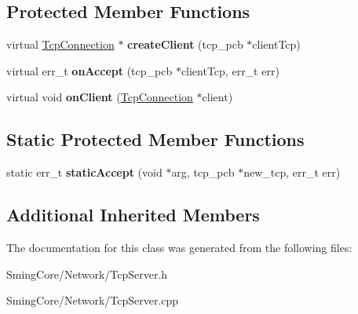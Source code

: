 \subsection*{Protected Member Functions}
\begin{DoxyCompactItemize}
\item 
\hypertarget{class_tcp_server_a15227a8a980f9123a79d09899ff5ad66}{}virtual \hyperlink{class_tcp_connection}{Tcp\+Connection} $\ast$ {\bfseries create\+Client} (tcp\+\_\+pcb $\ast$client\+Tcp)\label{class_tcp_server_a15227a8a980f9123a79d09899ff5ad66}

\item 
\hypertarget{class_tcp_server_ad75d1ec103e69988c873eddaad034465}{}virtual err\+\_\+t {\bfseries on\+Accept} (tcp\+\_\+pcb $\ast$client\+Tcp, err\+\_\+t err)\label{class_tcp_server_ad75d1ec103e69988c873eddaad034465}

\item 
\hypertarget{class_tcp_server_ad17f7bf486552944184eb089f97bbbe5}{}virtual void {\bfseries on\+Client} (\hyperlink{class_tcp_connection}{Tcp\+Connection} $\ast$client)\label{class_tcp_server_ad17f7bf486552944184eb089f97bbbe5}

\end{DoxyCompactItemize}
\subsection*{Static Protected Member Functions}
\begin{DoxyCompactItemize}
\item 
\hypertarget{class_tcp_server_aab00289a98c5c30c93d82ee3948590d1}{}static err\+\_\+t {\bfseries static\+Accept} (void $\ast$arg, tcp\+\_\+pcb $\ast$new\+\_\+tcp, err\+\_\+t err)\label{class_tcp_server_aab00289a98c5c30c93d82ee3948590d1}

\end{DoxyCompactItemize}
\subsection*{Additional Inherited Members}


The documentation for this class was generated from the following files\+:\begin{DoxyCompactItemize}
\item 
Sming\+Core/\+Network/Tcp\+Server.\+h\item 
Sming\+Core/\+Network/Tcp\+Server.\+cpp\end{DoxyCompactItemize}
